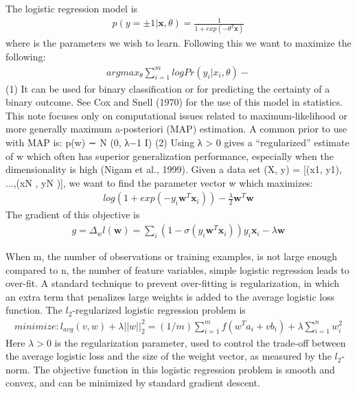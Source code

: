  The logistic regression model is
  \begin{eqnarray} 
 p(y = ±1|\textbf{x}, \theta) = \frac{1}{1 + exp( - \theta^T \textbf{x})}
  \end{eqnarray}
  where \theta is the parameters we wish to learn. Following this we want to maximize the following:
  \begin{eqnarray}
  argmax_\theta \sum_{i=1}^{m} log Pr(y_i | x_i,\theta) - 
    \end{eqnarray}
 (1)
 It can be used for binary classification or for predicting the certainty of a binary outcome. See Cox  and Snell (1970) for the use of this model in statistics. This note focuses only on computational issues related
 to maximum-likelihood or more generally maximum a-posteriori (MAP) estimation. A common
 prior to use with MAP is:
 p(w) ∼ N (0, λ−1  I) (2)
 Using λ > 0 gives a “regularized” estimate of w which often has superior generalization performance,
 especially when the dimensionality is high (Nigam et al., 1999).
 Given a data set (X, y) = [(x1, y1), ...,(xN , yN )], we want to find the parameter vector w which
 maximizes:
 \begin{eqnarray} 
 log(1 + exp(−y_i \textbf{w}^T \textbf{x}_i)) - \frac{\lambda}{2} \textbf{w}^T \textbf{w}
\end{eqnarray}
 The gradient of this objective is
 \begin{eqnarray} 
 g = \Delta_w l (\textbf{w}) = \sum_{i}^{} (1 - \sigma(y_i \textbf{w}^T	\textbf{x}_i)) y_i \textbf{x}_i - \lambda \textbf{w}
\end{eqnarray} 

When m, the number of observations or training examples, is not large enough compared to n, the number of feature variables, simple logistic regression leads to over-fit. A standard technique to prevent over-fitting is regularization, in which an extra term that penalizes large weights is added to the average logistic loss function. The $l_2$-regularized logistic regression problem is
\begin{eqnarray}
minimize:	  l_{avg}(v,w)+ \lambda||w||^2_2 = (1/m) \sum_{i=1}^{m} f(w^T a_i +vb_i) + \lambda \sum_{i=1}^{n} w_i^2
\end{eqnarray}
Here $\lambda > 0$ is the regularization parameter, used to control the trade-off between the average logistic loss and the size of the weight vector, as measured by the $l_2$-norm. The objective function in this logistic regression problem is smooth and convex, and can be minimized by standard gradient descent.



